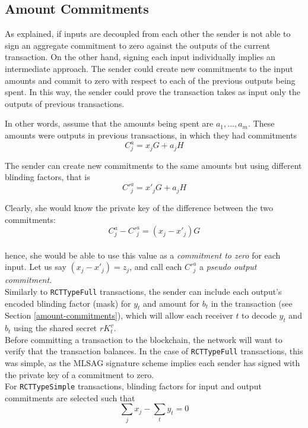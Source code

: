 \subsection{Amount Commitments}
\label{RCTTypeSimple-commitments}

As explained, if inputs are decoupled from each other the sender is not able to sign an aggregate commitment to zero against the outputs of the current transaction. On the other hand, signing each input individually implies an intermediate approach. The sender could create new commitments to the input amounts and commit to zero with respect to each of the previous outputs being spent. In this way, the sender could prove the transaction takes as input only the outputs of previous transactions.

In other words, assume that the amounts being spent are \(a_1, ..., a_m\). These amounts were outputs in previous transactions, in which they had commitments\\
\[C^a_{j} = x_j G + a_j H\]


The sender can create new commitments to the same amounts but using different blinding factors, that is
\[C'^a_{j} = x'_j G + a_j H\]

Clearly, she would know the private key of the difference between the two commitments: \\
\[ C^a_{j} - C'^a_{j} = (x_j - x'_j) G \] \\
hence, she would be able to use this value as a {\em commitment to zero} for each input. Let us say $(x_j - x'_j) = z_j$, and call each $C'^a_j$ a {\em pseudo output commitment}.
\\

Similarly to {\tt RCTTypeFull} transactions, the sender can include each output’s encoded blinding factor (mask) for $y_t$ and amount for $b_t$ in the transaction (see Section \ref{amount-commitments}), which will allow each receiver $t$ to decode $y_t$ and $b_t$ using the shared secret $r K_t^v$.
\\

Before committing a transaction to the blockchain, the network will want to verify that the transaction balances. In the case of {\tt RCTTypeFull} transactions, this was simple, as the MLSAG signature scheme implies each sender has signed with the private key of a commitment to zero.
\\

For {\tt RCTTypeSimple} transactions, blinding factors for input and output commitments are selected such that
\[\sum_j x_j  - \sum_t y_t = 0  \]

